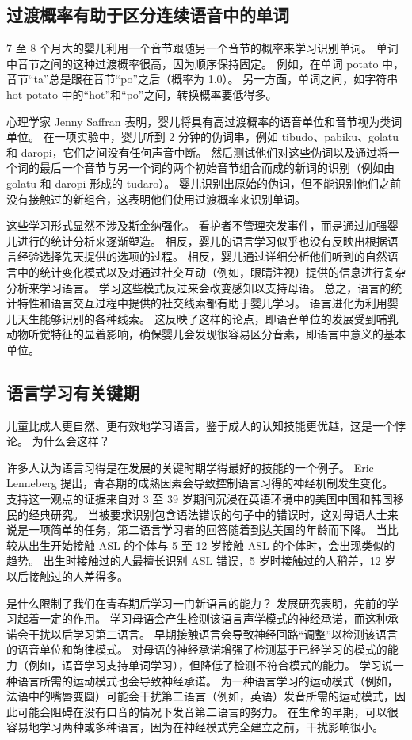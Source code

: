 \subsection{过渡概率有助于区分连续语音中的单词}

7 至 8 个月大的婴儿利用一个音节跟随另一个音节的概率来学习识别单词。 单词中音节之间的这种过渡概率很高，因为顺序保持固定。 例如，在单词 potato 中，音节“ta”总是跟在音节“po”之后（概率为 1.0）。 另一方面，单词之间，如字符串 hot potato 中的“hot”和“po”之间，转换概率要低得多。

心理学家 Jenny Saffran 表明，婴儿将具有高过渡概率的语音单位和音节视为类词单位。 在一项实验中，婴儿听到 2 分钟的伪词串，例如 tibudo、pabiku、golatu 和 daropi，它们之间没有任何声音中断。 然后测试他们对这些伪词以及通过将一个词的最后一个音节与另一个词的两个初始音节组合而成的新词的识别（例如由 golatu 和 daropi 形成的 tudaro）。 婴儿识别出原始的伪词，但不能识别他们之前没有接触过的新组合，这表明他们使用过渡概率来识别单词。

这些学习形式显然不涉及斯金纳强化。 看护者不管理突发事件，而是通过加强婴儿进行的统计分析来逐渐塑造。 相反，婴儿的语言学习似乎也没有反映出根据语言经验选择先天提供的选项的过程。 相反，婴儿通过详细分析他们听到的自然语言中的统计变化模式以及对通过社交互动（例如，眼睛注视）提供的信息进行复杂分析来学习语言。 学习这些模式反过来会改变感知以支持母语。 总之，语言的统计特性和语言交互过程中提供的社交线索都有助于婴儿学习。 语言进化为利用婴儿天生能够识别的各种线索。 这反映了这样的论点，即语音单位的发展受到哺乳动物听觉特征的显着影响，确保婴儿会发现很容易区分音素，即语言中意义的基本单位。

\subsection{语言学习有关键期}
儿童比成人更自然、更有效地学习语言，鉴于成人的认知技能更优越，这是一个悖论。 为什么会这样？

许多人认为语言习得是在发展的关键时期学得最好的技能的一个例子。 Eric Lenneberg 提出，青春期的成熟因素会导致控制语言习得的神经机制发生变化。 支持这一观点的证据来自对 3 至 39 岁期间沉浸在英语环境中的美国中国和韩国移民的经典研究。 当被要求识别包含语法错误的句子中的错误时，这对母语人士来说是一项简单的任务，第二语言学习者的回答随着到达美国的年龄而下降。 当比较从出生开始接触 ASL 的个体与 5 至 12 岁接触 ASL 的个体时，会出现类似的趋势。 出生时接触过的人最擅长识别 ASL 错误，5 岁时接触过的人稍差，12 岁以后接触过的人差得多。

是什么限制了我们在青春期后学习一门新语言的能力？ 发展研究表明，先前的学习起着一定的作用。 学习母语会产生检测该语言声学模式的神经承诺，而这种承诺会干扰以后学习第二语言。 早期接触语言会导致神经回路“调整”以检测该语言的语音单位和韵律模式。 对母语的神经承诺增强了检测基于已经学习的模式的能力（例如，语音学习支持单词学习），但降低了检测不符合模式的能力。 学习说一种语言所需的运动模式也会导致神经承诺。 为一种语言学习的运动模式（例如，法语中的嘴唇变圆）可能会干扰第二语言（例如，英语）发音所需的运动模式，因此可能会阻碍在没有口音的情况下发音第二语言的努力。 在生命的早期，可以很容易地学习两种或多种语言，因为在神经模式完全建立之前，干扰影响很小。

